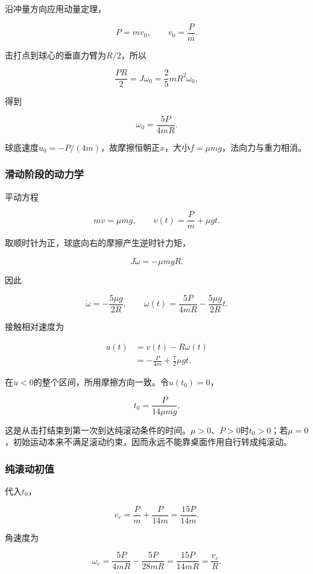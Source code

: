 \documentclass[12pt,a4paper,fontset=fandol]{ctexart}
\begin{document}
沿冲量方向应用动量定理，

\[
P=mv_0,\qquad \boxed{v_0=\frac Pm}.
\]

击打点到球心的垂直力臂为\(R/2\)，所以

\[
\frac{PR}{2}=J\omega_0
=\frac25mR^2\omega_0,
\]

得到

\[
\boxed{\omega_0=\frac{5P}{4mR}}.
\]

球底速度\(u_0=-P/(4m)\)，故摩擦恒朝正\(x\)，大小\(f=\mu mg\)，法向力与重力相消。

\subsubsection{滑动阶段的动力学}\label{ux6ed1ux52a8ux9636ux6bb5ux7684ux52a8ux529bux5b66}

平动方程

\[
m\dot v=\mu mg,
\qquad
v(t)=\frac Pm+\mu gt.
\]

取顺时针为正，球底向右的摩擦产生逆时针力矩，

\[
J\dot\omega=-\mu mgR.
\]

因此

\[
\dot\omega=-\frac{5\mu g}{2R},
\qquad
\omega(t)=\frac{5P}{4mR}-\frac{5\mu g}{2R}t.
\]

接触相对速度为

\[
\begin{aligned}
u(t)&=v(t)-R\omega(t)\\
&=-\frac P{4m}+\frac72\mu gt.
\end{aligned}
\]

在\(u<0\)的整个区间，所用摩擦方向一致。令\(u(t_0)=0\)，

\[
\boxed{t_0=\frac{P}{14\mu mg}}.
\]

这是从击打结束到第一次到达纯滚动条件的时间。\(\mu>0\)、\(P>0\)时\(t_0>0\)；若\(\mu=0\)，初始运动本来不满足滚动约束，因而永远不能靠桌面作用自行转成纯滚动。

\subsubsection{纯滚动初值}\label{ux7eafux6edaux52a8ux521dux503c}

代入\(t_0\)，

\[
v_c=\frac Pm+\frac P{14m}
=\boxed{\frac{15P}{14m}}.
\]

角速度为

\[
\omega_c=\frac{5P}{4mR}
-\frac{5P}{28mR}
=\frac{15P}{14mR}
=\frac{v_c}{R}.
\]
\end{document}
